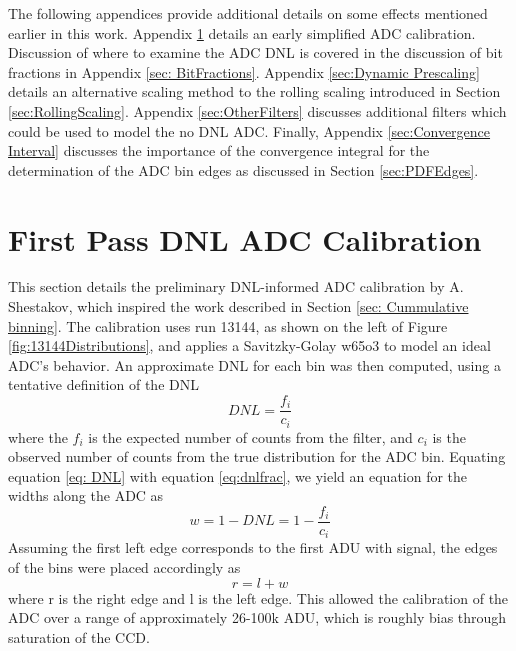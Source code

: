 \documentclass[linenumbers]{aastex7}
\begin{document}
The following appendices provide additional details on some effects mentioned earlier in this work. 
Appendix \ref{sec:Adrianmethod} details an early simplified ADC calibration. 
Discussion of where to examine the ADC DNL is covered in the discussion of bit fractions in Appendix \ref{sec: BitFractions}.
Appendix \ref{sec:Dynamic Prescaling} details an alternative scaling method to the rolling scaling introduced in Section \ref{sec:RollingScaling}. 
Appendix \ref{sec:OtherFilters} discusses additional filters which could be used to model the no DNL ADC. 
Finally, Appendix \ref{sec:Convergence Interval} discusses the importance of the convergence integral for the determination of the ADC bin edges as discussed in Section \ref{sec:PDFEdges}. 

\section{First Pass DNL ADC Calibration}
\label{sec:Adrianmethod}

This section details the preliminary DNL-informed ADC calibration by A. Shestakov, which inspired the work described in Section \ref{sec: Cummulative binning}.
The calibration uses run 13144, as shown on the left of Figure \ref{fig:13144Distributions}, and applies a Savitzky-Golay w65o3 to model an ideal ADC's behavior. 
An approximate DNL for each bin was then computed, using a tentative definition of the DNL  
 \begin{equation}
 DNL = \frac{f_i}{c_i}
 \label{eq:dnlfrac}
 \end{equation}
where the $f_{i}$ is the expected number of counts from the filter, and $c_{i}$ is the observed number of counts from the true distribution for the ADC bin. 
Equating equation \ref{eq: DNL} with equation \ref{eq:dnlfrac}, we yield an equation for the widths along the ADC as
 \begin{equation}
 w = 1-DNL = 1- \frac{f_i}{c_i}
 \end{equation}
Assuming the first left edge corresponds to the first ADU with signal, the edges of the bins were placed accordingly as
 \begin{equation}
r = l + w 
\end{equation}
where r is the right edge and l is the left edge. 
This allowed the calibration of the ADC over a range of approximately 26-100k ADU, which is roughly bias through saturation of the CCD.  
\end{document}
